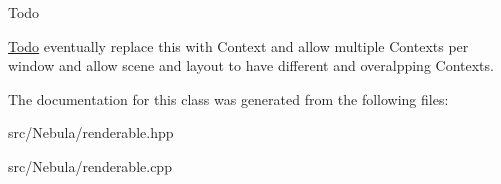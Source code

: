 \begin{DoxyRefDesc}{\-Todo}
\item[\hyperlink{todo__todo000011}{\-Todo}]eventually replace this with \-Context and allow multiple \-Contexts per window and allow scene and layout to have different and overalpping \-Contexts. \end{DoxyRefDesc}


\-The documentation for this class was generated from the following files\-:\begin{DoxyCompactItemize}
\item 
src/\-Nebula/renderable.\-hpp\item 
src/\-Nebula/renderable.\-cpp\end{DoxyCompactItemize}
